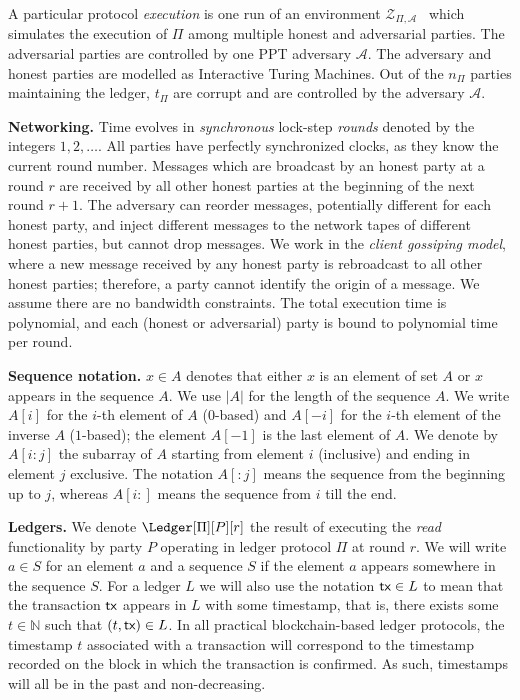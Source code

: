 A particular protocol \emph{execution}
is one run of an environment $\mathcal{Z}_{\Pi,\mathcal{A}}$~\cite{FOCS:Canetti01} which simulates
the execution of $\Pi$ among multiple honest and adversarial parties. The adversarial
parties are controlled by one PPT adversary $\mathcal{A}$. The adversary and honest
parties are modelled as Interactive Turing Machines.
Out of the
$n_\Pi$ parties maintaining the ledger, $t_\Pi$ are corrupt and are controlled by the adversary
$\mathcal{A}$.

\noindent
\textbf{Networking.}
Time evolves in \emph{synchronous} lock-step \emph{rounds} denoted by the integers $1, 2,
\ldots$. All parties have perfectly synchronized clocks, as they know the current round number.
Messages which are broadcast by an honest party at a round $r$ are received by all
other honest parties at the beginning of the next round $r + 1$. The adversary
can reorder messages, potentially different for each honest party, and
inject different messages to the network tapes of different honest parties,
but cannot drop messages. We work in the \emph{client gossiping model}, where
a new message received by any honest party is rebroadcast to all other honest
parties; therefore, a party cannot identify the origin of a message. We assume there are no bandwidth constraints.
The total execution time is polynomial, and each (honest or adversarial)
party is bound to polynomial time per round.

\noindent
\textbf{Sequence notation.}
$x \in A$ denotes that either $x$ is an element of set $A$ or $x$
appears in the sequence $A$. We use $|A|$ for the length of the sequence $A$.
We write $A[i]$ for the $i$-th element of $A$ ($0$-based) and $A[-i]$ for the
$i$-th element of the inverse $A$ ($1$-based); the element $A[-1]$ is the last element of $A$.
We denote by $A[{i}{:}{j}]$ the subarray of $A$ starting from element $i$ (inclusive)
and ending in element $j$ exclusive. The notation $A[{:}j]$ means the sequence
from the beginning up to $j$, whereas $A[i{:}]$ means the sequence from $i$ till
the end.

\noindent
\textbf{Ledgers.}
We denote $\Ledger[\Pi][P][r]$ the result of executing the \emph{read} functionality by party $P$
operating in ledger protocol $\Pi$ at round $r$. %
We will write
$a \in S$ for an element $a$ and a sequence $S$ if the element $a$ appears somewhere in
the sequence $S$. For a ledger $L$ we will also use the notation $\textsf{tx} \in L$ to mean that
the transaction $\textsf{tx}$ appears in $L$ with some timestamp, that is, there exists some $t \in \mathbb{N}$
such that $(t, \textsf{tx}) \in L$. In all practical blockchain-based ledger protocols, the timestamp $t$
associated with a transaction will correspond to the timestamp recorded on the block in which the
transaction is confirmed. As such, timestamps will all be in the past and non-decreasing.

